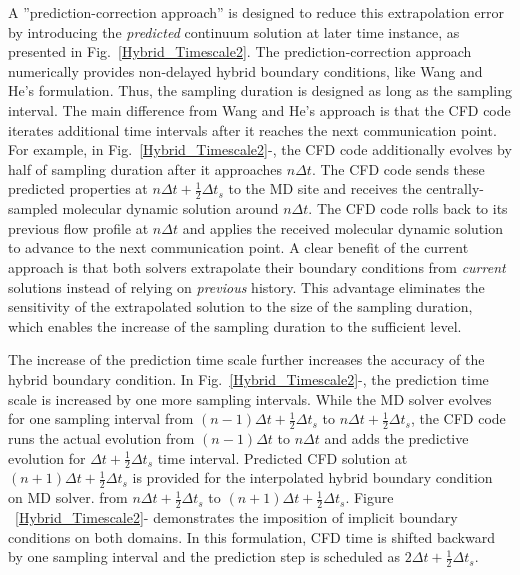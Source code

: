 \documentclass[preprint,12pt]{elsarticle}
\begin{document}
A ''prediction-correction approach'' is designed to reduce this 
extrapolation error by introducing the \textit{predicted} continuum solution at
later time instance, as presented in Fig.~\ref{Hybrid_Timescale2}.
The prediction-correction approach numerically provides non-delayed hybrid
boundary conditions, like Wang and He's formulation. Thus, the sampling
duration is designed as long as the sampling interval.
The main difference from Wang and He's approach is that the CFD code
iterates additional time intervals after it reaches the next communication point.
For example, in Fig.~\ref{Hybrid_Timescale2}-,
the CFD code additionally evolves by half of sampling duration after
it approaches $n{\Delta}t$. The CFD code sends these predicted properties
at $n{\Delta}t + \frac{1}{2}{\Delta}{t_s}$ to the MD site and receives the
centrally-sampled molecular dynamic solution around $n{\Delta}t$.
The CFD code rolls back to its previous flow profile at $n{\Delta}t$ and
applies the received molecular dynamic solution to advance to the next
communication point.
A clear benefit of the current approach is that both solvers extrapolate
their boundary conditions from \textit{current} solutions instead of
relying on \textit{previous} history. This advantage eliminates the
sensitivity of the extrapolated solution to the size of the sampling duration,
which enables the increase of the sampling duration to the sufficient level.

The increase of the prediction time scale further increases the accuracy
of the hybrid boundary condition.
In Fig.~\ref{Hybrid_Timescale2}-, the prediction
time scale is increased by one more sampling intervals. While the MD
solver evolves for one sampling interval
from $(n-1){\Delta}t + \frac{1}{2}{\Delta}{t_s}$ to $n{\Delta}t + \frac{1}{2}{\Delta}{t_s}$,
the CFD code runs the actual evolution from $(n-1){\Delta}t$ to $n{\Delta}t$
and adds the predictive evolution for ${\Delta}t + \frac{1}{2}{\Delta}{t_s}$ time
interval. Predicted CFD solution at $(n+1){\Delta}t + \frac{1}{2}{\Delta}{t_s}$
is provided for the interpolated hybrid boundary condition on MD solver.
from $n{\Delta}t + \frac{1}{2}{\Delta}{t_s}$ to $(n+1){\Delta}t + \frac{1}{2}{\Delta}{t_s}$.
Figure ~\ref{Hybrid_Timescale2}- demonstrates the
imposition of implicit boundary conditions on both domains. In this formulation,
CFD time is shifted backward by one sampling interval and the prediction step
is scheduled as $2{\Delta}t + \frac{1}{2}{\Delta}{t_s}$.
\end{document}
